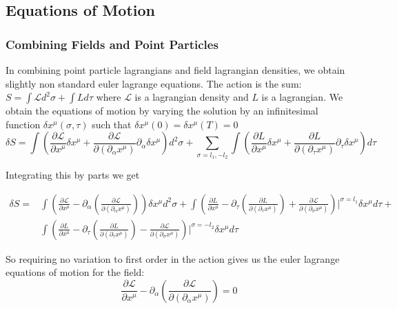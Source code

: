 \documentclass[11pt,a4paper]{article}
\begin{document}
\FloatBarrier
\subsection{Equations of Motion}
\label{sec:eom}

\FloatBarrier
\subsubsection{Combining Fields and Point Particles}

In combining point particle lagrangians and field lagrangian densities, we obtain slightly non standard euler lagrange equations. The action is the sum: $S=\int\mathcal{L}d^{2}\sigma+\int Ld\tau$ where $\mathcal{L}$ is a lagrangian density and $L$ is a lagrangian. We obtain the equations of motion by varying the solution by an infinitesimal function $\delta x^{\mu}(\sigma,\tau)$ such that $\delta x^{\mu}(0)=\delta x^{\mu}(T)=0$
\begin{equation*}
\delta S=\int\left(\frac{\partial\mathcal{L}}{\partial x^{\mu}}\delta x^{\mu}+\frac{\partial\mathcal{L}}{\partial(\partial_{\alpha}x^{\mu})}\partial_{\alpha}\delta x^{\mu}\right)d^{2}\sigma+\sum_{\sigma=l_1,-l_2} \int\left(\frac{\partial L}{\partial x^{\mu}}\delta x^{\mu}+\frac{\partial L}{\partial(\partial_{\tau}x^{\mu})}\partial_{\tau}\delta x^{\mu}\right)d\tau
\end{equation*}

Integrating this by parts we get

\begin{align*}
\delta S=&\int\left(\frac{\partial\mathcal{L}}{\partial x^{\mu}}-\partial_{\alpha}\left(\frac{\partial\mathcal{L}}{\partial(\partial_{\alpha}x^{\mu})}\right)\right)\delta x^{\mu}d^{2}\sigma+
\int\left(\frac{\partial L}{\partial x^{\mu}}-\partial_{\tau}\left(\frac{\partial L}{\partial(\partial_{\tau}x^{\mu})}\right)+\frac{\partial\mathcal{L}}{\partial(\partial_{\sigma}x^{\mu})}\right)|^{\sigma=l_{1}}\delta x^{\mu}d\tau+\\
&\int\left(\frac{\partial L}{\partial x^{\mu}}-\partial_{\tau}\left(\frac{\partial L}{\partial(\partial_{\tau}x^{\mu})}\right)-\frac{\partial\mathcal{L}}{\partial(\partial_{\sigma}x^{\mu})}\right)|^{\sigma=-l_{2}}\delta x^{\mu}d\tau
\end{align*} 

So requiring no variation to first order in the action gives us the euler lagrange equations of motion for the field:
\begin{equation}
\label{eq:eulerfield}
\frac{\partial\mathcal{L}}{\partial x^{\mu}}-\partial_{\alpha}\left(\frac{\partial\mathcal{L}}{\partial(\partial_{\alpha}x^{\mu})}\right)=0
\end{equation}
\end{document}
